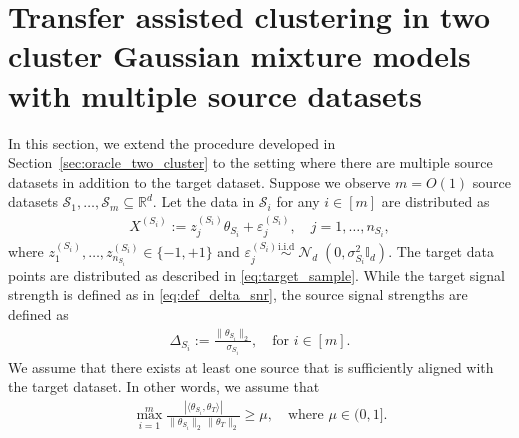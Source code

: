 \documentclass[10pt]{article}
\newcommand{\R}{\mathbb R}
\newcommand{\simiid}{\overset{\mathrm{i.i.d}}{\sim}}
\newcommand{\Id}{\mathbb I}
\DeclareMathOperator{\dnorm}{\mathcal N}
\newcommand{\trg}{T}
\newcommand{\thetaT}{\theta_{\trg}}
\newcommand{\calS}{\mathcal S}
\newcommand{\src}{S}
\newcommand{\nSm}[1]{n_{\src_{#1}}}
\newcommand{\sigmaSm}[1]{\sigma_{\src_{#1}}}
\newcommand{\Xsrcm}[1]{X^{(\src_{#1})}}
\newcommand{\zsrcm}[1]{z^{(\src_{#1})}}
\newcommand{\thetamS}[1]{\theta_{\src_{#1}}}
\newcommand{\epsm}[1]{\varepsilon^{(\src_{#1})}}
\newcommand{\DeltaSm}[1]{\Delta_{\src_{#1}}}
\begin{document}
\section{Transfer assisted clustering in two cluster Gaussian mixture models with multiple source datasets}
\label{sec:two_clust_mult_source}
In this section, we extend the procedure developed in Section~\ref{sec:oracle_two_cluster} to the setting where there are multiple source datasets in addition to the target dataset. Suppose we observe $m=O(1)$ source datasets $\calS_1,\ldots,\calS_m \subseteq \R^d$. Let the data in $\calS_i$ for any $i \in [m]$ are distributed as
\begin{align}
    \label{eq:two_cluster_mult_source}
    \Xsrcm{i}:=\zsrcm{i}_j\thetamS{i}+\epsm{i}_j, \quad j=1,\ldots,\nSm{i},
\end{align}
where $\zsrcm{i}_1,\ldots,\zsrcm{i}_{\nSm{i}} \in \{-1,+1\}$ and $\epsm{i}_j \simiid \dnorm_d(0,\sigmaSm{i}^2\Id_d)$.
The target data points are distributed as described in \eqref{eq:target_sample}. While the target signal strength is defined as in \eqref{eq:def_delta_snr}, the source signal strengths are defined as
\begin{align}
    \label{eq:multi_source_snr}
    \DeltaSm{i}:=\frac{\|\thetamS{i}\|_2}{\sigmaSm{i}}, \quad \mbox{for $i \in [m]$.}
\end{align}
We assume that there exists at least one source that is sufficiently aligned with the target dataset. In other words, we assume that 
\begin{align}
\label{eq:multis_alignment}
    \max_{i=1}^{m} \frac{|\langle \thetamS{i},\thetaT\rangle|}{\|\thetamS{i}\|_2\,\|\thetaT\|_2} \ge \mu, \quad \mbox{where $\mu \in (0,1]$.}
\end{align}
\end{document}

